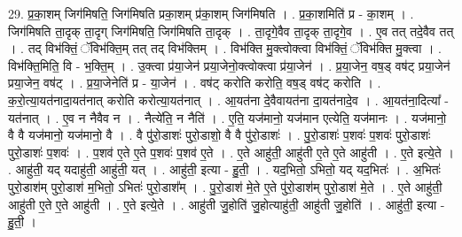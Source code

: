 \documentclass[17pt]{extarticle}
\begin{document}
29. प्र॒का॒शम् जिग॑मिषति॒ जिग॑मिषति प्रका॒शम् प्र॑का॒शम् जिग॑मिषति । . प्र॒का॒शमिति॑ प्र - का॒शम् । . जिग॑मिषति ता॒दृक् ता॒दृग् जिग॑मिषति॒ जिग॑मिषति ता॒दृक् । . ता॒दृगे॒वैव ता॒दृक् ता॒दृगे॒व । . ए॒व तत् तदे॒वैव तत् । . तद् विभ॑क्तिं॒ ॅविभ॑क्ति॒म् तत् तद् विभ॑क्तिम् । . विभ॑क्ति मु॒क्त्वोक्त्वा विभ॑क्तिं॒ ॅविभ॑क्ति मु॒क्त्वा । . विभ॑क्ति॒मिति॒ वि - भ॒क्ति॒म् । . उ॒क्त्वा प्र॑या॒जेन॑ प्रया॒जेनो॒क्त्वोक्त्वा प्र॑या॒जेन॑ । . प्र॒या॒जेन॒ वष॒ड् वष॑ट् प्रया॒जेन॑ प्रया॒जेन॒ वष॑ट् । . प्र॒या॒जेनेति॑ प्र - या॒जेन॑ । . वष॑ट् करोति करोति॒ वष॒ड् वष॑ट् करोति । . क॒रो॒त्या॒यत॑नादा॒यत॑नात् करोति करोत्या॒यत॑नात् । . आ॒यत॑ना दे॒वैवायत॑ना दा॒यत॑नादे॒व । . आ॒यत॑ना॒दित्या᳚ - यत॑नात् । . ए॒व न नैवैव न । . नैत्ये॑ति॒ न नैति॑ । . ए॒ति॒ यज॑मानो॒ यज॑मान एत्येति॒ यज॑मानः । . यज॑मानो॒ वै वै यज॑मानो॒ यज॑मानो॒ वै । . वै पु॑रो॒डाशः॑ पुरो॒डाशो॒ वै वै पु॑रो॒डाशः॑ । . पु॒रो॒डाशः॑ प॒शवः॑ प॒शवः॑ पुरो॒डाशः॑ पुरो॒डाशः॑ प॒शवः॑ । . प॒शव॑ ए॒ते ए॒ते प॒शवः॑ प॒शव॑ ए॒ते । . ए॒ते आहु॑ती॒ आहु॑ती ए॒ते ए॒ते आहु॑ती । . ए॒ते इत्ये॒ते । . आहु॑ती॒ यद् यदाहु॑ती॒ आहु॑ती॒ यत् । . आहु॑ती॒ इत्या - हु॒ती॒ । . यद॒भितो॒ ऽभितो॒ यद् यद॒भितः॑ । . अ॒भितः॑ पुरो॒डाश॑म् पुरो॒डाश॑ म॒भितो॒ ऽभितः॑ पुरो॒डाश᳚म् । . पु॒रो॒डाश॑ मे॒ते ए॒ते पु॑रो॒डाश॑म् पुरो॒डाश॑ मे॒ते । . ए॒ते आहु॑ती॒ आहु॑ती ए॒ते ए॒ते आहु॑ती । . ए॒ते इत्ये॒ते । . आहु॑ती जु॒होति॑ जु॒होत्याहु॑ती॒ आहु॑ती जु॒होति॑ । . आहु॑ती॒ इत्या - हु॒ती॒ । \newline
\end{document}
